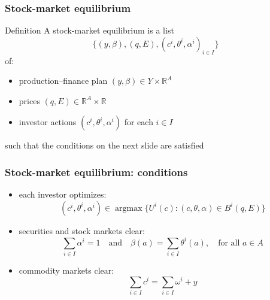 \documentclass[blue]{beamer}
\def\R{\mathbb{R}}
\def\et{\quad \textrm{and} \quad}
\DeclareMathOperator\argmax{argmax}
\theoremstyle{definition}
\theoremstyle{example}
\begin{document}
\begin{frame}\frametitle{Stock-market equilibrium}
\begin{block}{Definition}
A stock-market equilibrium is a list
\begin{equation*}
\bigl\{ (y, \beta), (q, E), (c^i, \theta^i, \alpha^i)_{i \in I} \bigr\}
\end{equation*}
of:
\begin{itemize}
\item production--finance plan $(y, \beta) \in Y \times \R^A$
\item prices $(q, E) \in \R^A \times \R$
\item investor actions $(c^i, \theta^i, \alpha^i)$ for each $i \in I$
\end{itemize}
\end{block}
\bigskip

such that the conditions on the next slide are satisfied
\end{frame}

\begin{frame}\frametitle{Stock-market equilibrium: conditions}
\begin{itemize}
\item[(a)] each investor optimizes:
\begin{equation*}
(c^i, \theta^i, \alpha^i) \in \argmax \bigl\{ U^i(c) \colon (c, \theta, \alpha) \in B^i(q, E) \bigr\}
\end{equation*}

\item[(b)] securities and stock markets clear:
\begin{equation*}
\sum_{i \in I} \alpha^i = 1 \et \beta(a) = \sum_{i \in I} \theta^i(a), \quad \text{for all $a\in A$}
\end{equation*}

\item[(c)] commodity markets clear:
\begin{equation*}
\sum_{i \in I} c^i = \sum_{i \in I} \omega^i + y
\end{equation*}
\end{itemize}
\end{frame}
\end{document}
